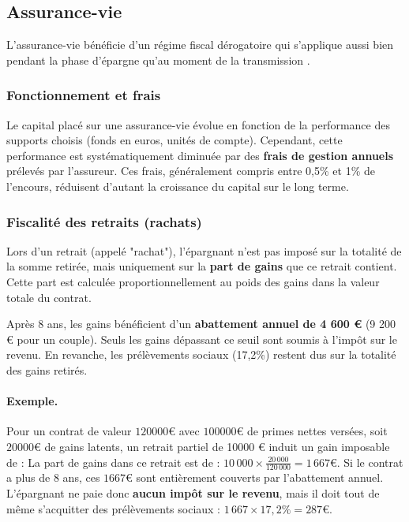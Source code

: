 \subsection{Assurance-vie}
\label{sec:assurance_vie}

L'assurance-vie bénéficie d'un régime fiscal dérogatoire qui s'applique aussi bien pendant la phase d'épargne qu'au moment de la transmission \cite{cgi_990i, cgi_757b, bofip_mutations_av}.

\subsubsection{Fonctionnement et frais}
\label{sec:rendement_prelevements}

Le capital placé sur une assurance-vie évolue en fonction de la performance des supports choisis (fonds en euros, unités de compte). Cependant, cette performance est systématiquement diminuée par des \textbf{frais de gestion annuels} prélevés par l'assureur. Ces frais, généralement compris entre 0,5\% et 1\% de l'encours, réduisent d'autant la croissance du capital sur le long terme.

\subsubsection{Fiscalité des retraits (rachats)}
\label{sec:rachats_partiels}

Lors d'un retrait (appelé "rachat"), l'épargnant n'est pas imposé sur la totalité de la somme retirée, mais uniquement sur la \textbf{part de gains} que ce retrait contient. Cette part est calculée proportionnellement au poids des gains dans la valeur totale du contrat.

Après 8 ans, les gains bénéficient d'un \textbf{abattement annuel de 4 600 €} (9 200 € pour un couple). Seuls les gains dépassant ce seuil sont soumis à l'impôt sur le revenu. En revanche, les prélèvements sociaux (17,2\%) restent dus sur la totalité des gains retirés.

\paragraph{Exemple.} Pour un contrat de valeur \(120000 €\) avec \(100000 €\) de primes nettes versées, soit \(20000 €\) de gains latents, un retrait partiel de 10000 € induit un gain imposable de :
La part de gains dans ce retrait est de : \(10\,000 \times \frac{20\,000}{120\,000} = 1\,667 €\).
Si le contrat a plus de 8 ans, ces \(1 667 €\) sont entièrement couverts par l'abattement annuel. L'épargnant ne paie donc \textbf{aucun impôt sur le revenu}, mais il doit tout de même s'acquitter des prélèvements sociaux : \(1\,667 \times 17,2\% = 287 €\).

